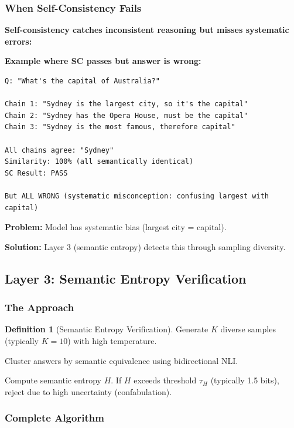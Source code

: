 \documentclass[12pt,a4paper]{article}
\theoremstyle{definition}
\newtheorem{definition}[theorem]{Definition}
\begin{document}
\subsubsection{When Self-Consistency Fails}

\begin{whybox}
\textbf{Self-consistency catches inconsistent reasoning but misses systematic errors:}

\textbf{Example where SC passes but answer is wrong:}

\begin{verbatim}
Q: "What's the capital of Australia?"

Chain 1: "Sydney is the largest city, so it's the capital"
Chain 2: "Sydney has the Opera House, must be the capital"
Chain 3: "Sydney is the most famous, therefore capital"

All chains agree: "Sydney"
Similarity: 100% (all semantically identical)
SC Result: PASS

But ALL WRONG (systematic misconception: confusing largest with capital)
\end{verbatim}

\textbf{Problem:} Model has systematic bias (largest city = capital).

\textbf{Solution:} Layer 3 (semantic entropy) detects this through sampling diversity.
\end{whybox}

\subsection{Layer 3: Semantic Entropy Verification}

\subsubsection{The Approach}

\begin{definition}[Semantic Entropy Verification]
Generate $K$ diverse samples (typically $K=10$) with high temperature.

Cluster answers by semantic equivalence using bidirectional NLI.

Compute semantic entropy $H$. If $H$ exceeds threshold $\tau_H$ (typically 1.5 bits), reject due to high uncertainty (confabulation).
\end{definition}

\subsubsection{Complete Algorithm}
\end{document}
